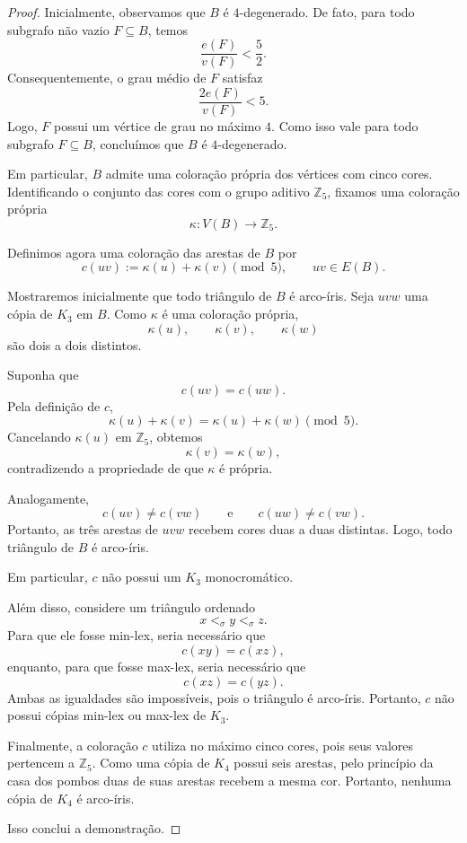 \documentclass[reqno, 12pt]{amsart}
\numberwithin{equation}{section}
\theoremstyle{plain}
\theoremstyle{definition}
\begin{document}
\begin{proof}
  Inicialmente, observamos que $B$ é $4$-degenerado. De fato, para
  todo subgrafo não vazio $F\subseteq B$, temos
  \[
    \frac{e(F)}{v(F)}<\frac52.
  \]
  Consequentemente, o grau médio de $F$ satisfaz
  \[
    \frac{2e(F)}{v(F)}<5.
  \]
  Logo, $F$ possui um vértice de grau no máximo $4$. Como isso vale
  para todo subgrafo $F\subseteq B$, concluímos que $B$ é
  $4$-degenerado.

  Em particular, $B$ admite uma coloração própria dos vértices com
  cinco cores. Identificando o conjunto das cores com o grupo
  aditivo $\mathbb{Z}_5$, fixamos uma coloração própria
  \[
    \kappa:V(B)\longrightarrow\mathbb{Z}_5.
  \]

  Definimos agora uma coloração das arestas de $B$ por
  \[
    c(uv):=\kappa(u)+\kappa(v)\pmod 5,
    \qquad uv\in E(B).
  \]

  Mostraremos inicialmente que todo triângulo de $B$ é arco-íris.
  Seja $uvw$ uma cópia de $K_3$ em $B$. Como $\kappa$ é uma
  coloração própria,
  \[
    \kappa(u),\qquad
    \kappa(v),\qquad
    \kappa(w)
  \]
  são dois a dois distintos.

  Suponha que
  \[
    c(uv)=c(uw).
  \]
  Pela definição de $c$,
  \[
    \kappa(u)+\kappa(v)
    =
    \kappa(u)+\kappa(w)
    \pmod 5.
  \]
  Cancelando $\kappa(u)$ em $\mathbb{Z}_5$, obtemos
  \[
    \kappa(v)=\kappa(w),
  \]
  contradizendo a propriedade de que $\kappa$ é própria.

  Analogamente,
  \[
    c(uv)\neq c(vw)
    \qquad\text{e}\qquad
    c(uw)\neq c(vw).
  \]
  Portanto, as três arestas de $uvw$ recebem cores duas a duas
  distintas. Logo, todo triângulo de $B$ é arco-íris.

  Em particular, $c$ não possui um $K_3$ monocromático.

  Além disso, considere um triângulo ordenado
  \[
    x<_\sigma y<_\sigma z.
  \]
  Para que ele fosse min-lex, seria necessário que
  \[
    c(xy)=c(xz),
  \]
  enquanto, para que fosse max-lex, seria necessário que
  \[
    c(xz)=c(yz).
  \]
  Ambas as igualdades são impossíveis, pois o triângulo é
  arco-íris. Portanto, $c$ não possui cópias min-lex ou max-lex de
  $K_3$.

  Finalmente, a coloração $c$ utiliza no máximo cinco cores, pois
  seus valores pertencem a $\mathbb{Z}_5$. Como uma cópia de $K_4$
  possui seis arestas, pelo princípio da casa dos pombos duas de
  suas arestas recebem a mesma cor. Portanto, nenhuma cópia de
  $K_4$ é arco-íris.

  Isso conclui a demonstração.
\end{proof}
\end{document}

